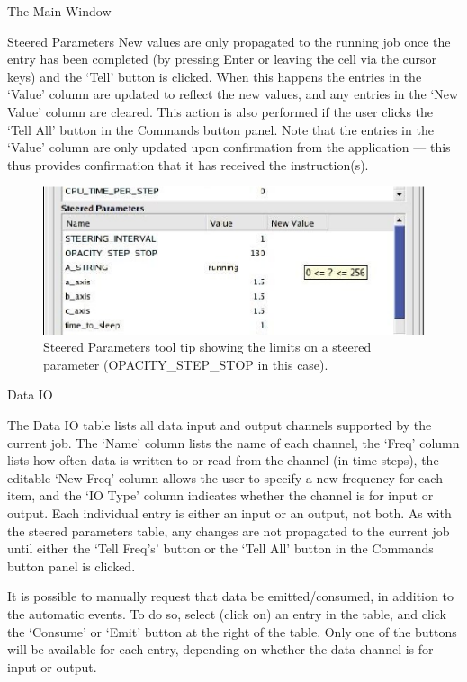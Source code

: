 \documentclass[a4paper,twoside]{article}
\begin{document}
\begin{section}{The Main Window}
\begin{subsection}{Steered Parameters}
New values are only propagated to the running job once the entry has
been completed (by pressing Enter or leaving the cell via the cursor
keys) and the `Tell' button is clicked. When this happens the entries
in the `Value' column are updated to reflect the new values, and any
entries in the `New Value' column are cleared. This action is also
performed if the user clicks the `Tell All' button in the Commands button
panel.  Note that the entries in the `Value' column are only updated
upon confirmation from the application --- this thus provides
confirmation that it has received the instruction(s).

\begin{figure}
\centerline{\includegraphics{limits_tool_tip.eps}}
\caption{Steered Parameters tool tip showing the limits on a steered
parameter (OPACITY\_\-STEP\_\-STOP in this case).}
\label{fig:limits_tool_tip}
\end{figure}

\end{subsection} %


\begin{subsection}{Data IO}

The Data IO table lists all data input and output channels supported
by the current job. The `Name' column lists the name of each channel,
the `Freq' column lists how often data is written to or read from the
channel (in time steps), the editable `New Freq' column allows the
user to specify a new frequency for each item, and the `IO Type'
column indicates whether the channel is for input or output.  Each
individual entry is either an input or an output, not both. As with
the steered parameters table, any changes are not propagated to the
current job until either the `Tell Freq's' button or the `Tell All'
button in the Commands button panel is clicked.

It is possible to manually request that data be emitted/consumed, in
addition to the automatic events. To do so, select (click on) an entry
in the table, and click the `Consume' or `Emit' button at the right
of the table. Only one of the buttons will be available for each
entry, depending on whether the data channel is for input or output.


\end{subsection}
\end{section}
\end{document}
